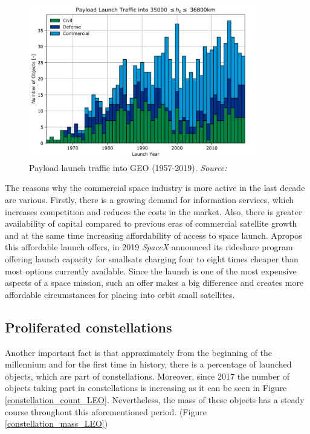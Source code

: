 \begin{figure}
\centering
\includegraphics[width=0.9\textwidth]{Images/launch_traffic_GEO.png}\caption{Payload launch traffic into GEO (1957-2019). \textit{Source: \cite{ESA 2020}}}
\label{launch_traffic_GEO} 
\end{figure}

The reasons why the commercial space industry is more active in the last decade are various. Firstly, there is a growing demand for information services, which increases competition and reduces the costs in the market. Also, there is greater availability of capital compared to previous eras of commercial satellite growth and at the same time increasing affordability of access to space launch. \cite{Hallex} Apropos this affordable launch offers, in 2019 \textit{SpaceX} announced its rideshare program offering launch capacity for smallsats charging four to eight times cheaper than most options currently available. Since the launch is one of the most expensive aspects of a space mission, such an offer makes a big difference and creates more affordable circumstances for placing into orbit small satellites. \cite{Erwin}

\bigskip
\subsection{Proliferated constellations}
\bigskip

Another important fact is that approximately from the beginning of the millennium and for the first time in history, there is a percentage of launched objects, which are part of constellations. Moreover, since 2017 the number of objects taking part in constellations is increasing as it can be seen in Figure \ref{constellation_count_LEO}. Nevertheless, the mass of these objects has a steady course throughout this aforementioned period. (Figure \ref{constellation_mass_LEO})

